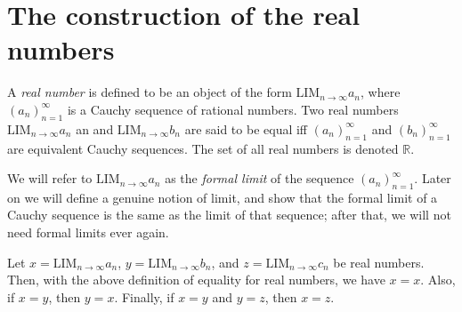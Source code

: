 \section{The construction of the real numbers}\label{sec 5.3}

\begin{definition}\label{5.3.1}
A \emph{real number} is defined to be an object of the form \(\text{LIM}_{n \to \infty} a_n\), where \((a_n)_{n = 1}^{\infty}\) is a Cauchy sequence of rational numbers.
Two real numbers \(\text{LIM}_{n \to \infty} a_n\) an and \(\text{LIM}_{n \to \infty} b_n\) are said to be equal iff \((a_n)_{n = 1}^{\infty}\) and \((b_n)_{n = 1}^{\infty}\) are equivalent Cauchy sequences.
The set of all real numbers is denoted \(\mathds{R}\).
\end{definition}

\begin{note}
We will refer to \(\text{LIM}_{n \to \infty} a_n\) as the \emph{formal limit} of the sequence \((a_n)_{n = 1}^{\infty}\).
Later on we will define a genuine notion of limit, and show that the formal limit of a Cauchy sequence is the same as the limit of that sequence;
after that, we will not need formal limits ever again.
\end{note}

\setcounter{theorem}{2}
\begin{proposition}\label{5.3.3}
Let \(x = \text{LIM}_{n \to \infty} a_n\), \(y = \text{LIM}_{n \to \infty} b_n\), and \(z = \text{LIM}_{n \to \infty} c_n\) be real numbers.
Then, with the above definition of equality for real numbers, we have \(x = x\).
Also, if \(x = y\), then \(y = x\).
Finally, if \(x = y\) and \(y = z\), then \(x = z\).
\end{proposition}

